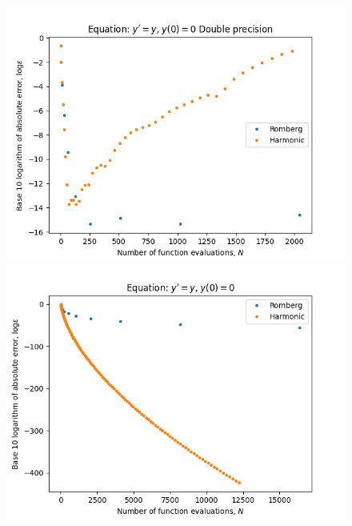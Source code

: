\begin{figure}[H]
\centering
\begin{minipage}{0.45\textwidth}
\centering
\includegraphics[scale=0.45]{../results/emr_plots/exp_growth.png}
\end{minipage}
\begin{minipage}{0.45\textwidth}
\centering
\includegraphics[scale=0.45]{../results/emr_plots/exp_growth_hp.png}
\end{minipage}
\end{figure}

